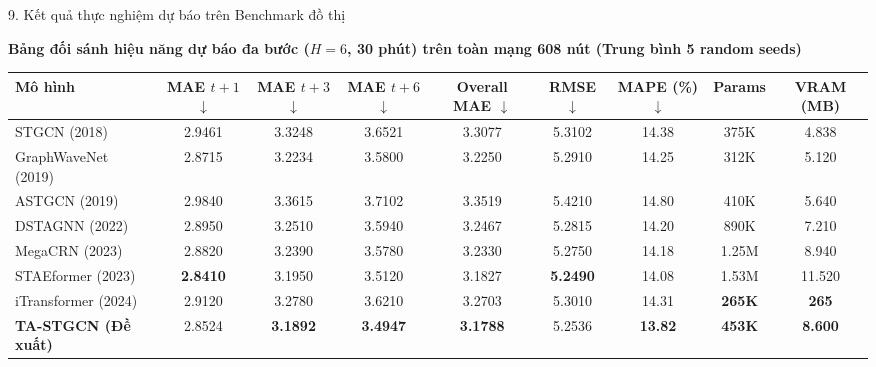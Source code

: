 \documentclass[aspectratio=169,10pt]{beamer}
\begin{document}
\begin{frame}{9. Kết quả thực nghiệm dự báo trên Benchmark đồ thị}
  \begin{block}{\textbf{Bảng đối sánh hiệu năng dự báo đa bước ($H=6$, 30 phút) trên toàn mạng 608 nút (Trung bình 5 random seeds)}}
    \centering
    \fontsize{6.2pt}{7.2pt}\selectfont
    \renewcommand{\arraystretch}{1.03}
    \setlength{\tabcolsep}{3.0pt}
    \begin{tabular}{lcccccccc}
      \toprule
      \textbf{Mô hình} & \textbf{MAE $t+1$} $\downarrow$ & \textbf{MAE $t+3$} $\downarrow$ & \textbf{MAE $t+6$} $\downarrow$ & \textbf{Overall MAE} $\downarrow$ & \textbf{RMSE} $\downarrow$ & \textbf{MAPE} (\%) $\downarrow$ & \textbf{Params} & \textbf{VRAM (MB)} \\
      \midrule
      STGCN (2018) & 2.9461 & 3.3248 & 3.6521 & 3.3077 & 5.3102 & 14.38 & 375K & 4.838 \\
      GraphWaveNet (2019) & 2.8715 & 3.2234 & 3.5800 & 3.2250 & 5.2910 & 14.25 & 312K & 5.120 \\
      ASTGCN (2019) & 2.9840 & 3.3615 & 3.7102 & 3.3519 & 5.4210 & 14.80 & 410K & 5.640 \\
      DSTAGNN (2022) & 2.8950 & 3.2510 & 3.5940 & 3.2467 & 5.2815 & 14.20 & 890K & 7.210 \\
      MegaCRN (2023) & 2.8820 & 3.2390 & 3.5780 & 3.2330 & 5.2750 & 14.18 & 1.25M & 8.940 \\
      STAEformer (2023) & \textbf{2.8410} & 3.1950 & 3.5120 & 3.1827 & \textbf{5.2490} & 14.08 & 1.53M & 11.520 \\
      iTransformer (2024) & 2.9120 & 3.2780 & 3.6210 & 3.2703 & 5.3010 & 14.31 & \textbf{265K} & \textbf{265} \\
      \midrule
      \textbf{TA-STGCN (Đề xuất)} & 2.8524 & \textbf{3.1892} & \textbf{3.4947} & \textbf{3.1788} & 5.2536 & \textbf{13.82} & \textbf{453K} & \textbf{8.600} \\
      \bottomrule
    \end{tabular}
  \end{block}


\end{frame}
\end{document}
